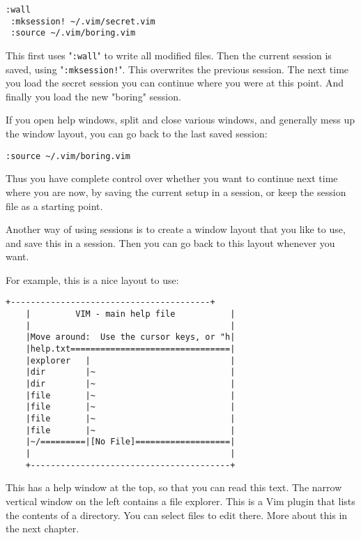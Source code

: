 \begin{Verbatim}[samepage=true]
 :wall
 :mksession! ~/.vim/secret.vim
 :source ~/.vim/boring.vim
\end{Verbatim}

This first uses "\texttt{:wall}" to write all modified files.
Then the current session is saved, using "\texttt{:mksession!}".
This overwrites the previous session.
The next time you load the secret session you can continue where you were at this point.
And finally you load the new "boring" session.

If you open help windows, split and close various windows, and generally mess up the window layout, you can go back to the last saved session:

\begin{Verbatim}[samepage=true]
 :source ~/.vim/boring.vim
\end{Verbatim}

Thus you have complete control over whether you want to continue next time where you are now, by saving the current setup in a session, or keep the session file as a starting point.

Another way of using sessions is to create a window layout that you like to use, and save this in a session.
Then you can go back to this layout whenever you want.

For example, this is a nice layout to use:

\begin{Verbatim}[samepage=true]
    +----------------------------------------+
    |         VIM - main help file           |
    |                                        |
    |Move around:  Use the cursor keys, or "h|
    |help.txt================================|
    |explorer   |                            |
    |dir        |~                           |
    |dir        |~                           |
    |file       |~                           |
    |file       |~                           |
    |file       |~                           |
    |file       |~                           |
    |~/=========|[No File]===================|
    |                                        |
    +----------------------------------------+
\end{Verbatim}

This has a help window at the top, so that you can read this text.
The narrow vertical window on the left contains a file explorer.
This is a Vim plugin that lists the contents of a directory.
You can select files to edit there.
More about this in the next chapter.

